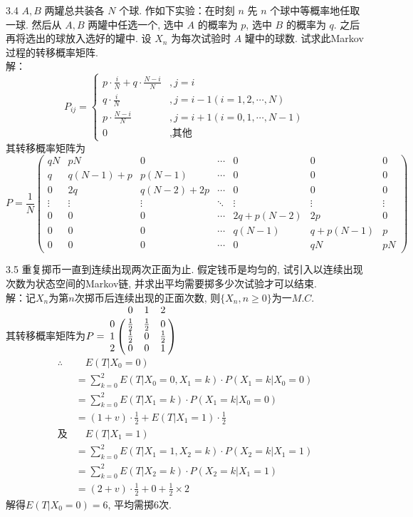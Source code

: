 3.4 $A, B$ 两罐总共装各 $N$ 个球. 作如下实验：在时刻 $n$ 先 $n$ 个球中等概率地任取一球. 然后从 $A, B$ 两罐中任选一个, 选中 $A$ 的概率为 $p$, 选中 $B$ 的概率为 $q$. 之后再将选出的球放入选好的罐中. 设 $X_n$ 为每次试验时 $A$ 罐中的球数. 试求此Markov过程的转移概率矩阵.\\
解：
\[
P_{ij} =
\begin{cases}
p \cdot \frac{i}{N} + q \cdot \frac{N-i}{N} & , j = i\\
q \cdot \frac{i}{N} & , j = i-1(i=1,2,\cdots ,N)\\
p \cdot \frac{N-i}{N} & , j = i+1(i=0,1,\cdots ,N-1)\\
0 & , \text{其他}
\end{cases}
\]
其转移概率矩阵为
\[
P = \frac{1}{N}
\begin{pmatrix}
qN & pN & 0 & \cdots & 0 & 0 & 0 \\
q & q(N-1)+p & p(N-1) & \cdots & 0 & 0 & 0 \\
0 & 2q & q(N-2)+2p & \cdots & 0 & 0 & 0\\
\vdots & \vdots & \vdots & \ddots & \vdots & \vdots & \vdots \\
0 & 0 & 0 & \cdots & 2q+p(N-2) & 2p & 0\\
0 & 0 & 0 & \cdots & q(N-1) & q+p(N-1) & p\\
0 & 0 & 0 & \cdots & 0 & qN & pN
\end{pmatrix}
\]


3.5 重复掷币一直到连续出现两次正面为止. 假定钱币是均匀的, 试引入以连续出现次数为状态空间的Markov链, 并求出平均需要掷多少次试验才可以结束.\\
解：记$X_n$为第$n$次掷币后连续出现的正面次数, 则$\{X_n, n \geqslant 0 \}$为一$M.C.$\\
其转移概率矩阵为$P = \bordermatrix{
				~ & 0 & 1 & 2 \cr
				0 & \frac{1}{2} & \frac{1}{2} & 0 \cr
				1 & \frac{1}{2} & 0 & \frac{1}{2} \cr
				2 & 0 & 0 & 1
				}$\\
\[
\begin{split}
\therefore & \quad E(T | X_0 = 0)\\
		& = \sum^2_{k=0}E(T|X_0 = 0, X_1 = k)\cdot P(X_1 = k | X_0 = 0)\\
		& = \sum^2_{k=0}E(T|X_1 = k)\cdot P(X_1 = k | X_0 = 0)\\
		& = (1+v)\cdot \frac{1}{2} + E(T| X_1 = 1) \cdot \frac{1}{2}\\
\text{及}& \quad E(T | X_1 = 1)\\
		& = \sum^2_{k=0}E(T|X_1 = 1, X_2 = k)\cdot P(X_2 = k | X_1 = 1)\\
		& = \sum^2_{k=0}E(T|X_2 = k)\cdot P(X_2 = k | X_1 = 1)\\
		& = (2+v)\cdot \frac{1}{2} + 0 + \frac{1}{2} \times 2
\end{split}
\]
解得$E(T | X_0 = 0) = 6$, 平均需掷$6$次. \\


